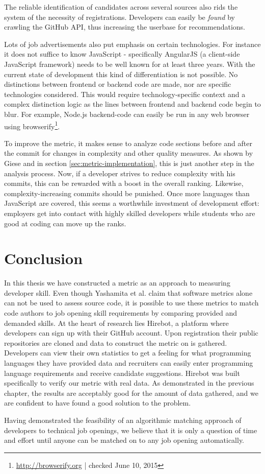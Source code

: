 The reliable identification of candidates across several sources also rids the system of the necessity of registrations. Developers can easily be \textit{found} by crawling the GitHub API, thus increasing the userbase for recommendations.


Lots of job advertisements also put emphasis on certain technologies. For instance it does not suffice to know JavaScript - specifically AngularJS (a client-side JavaScript framework) needs to be well known for at least three years. With the current state of development this kind of differentiation is not possible. No distinctions between frontend or backend code are made, nor are specific technologies considered. This would require technology-specific context and a complex distinction logic as the lines between frontend and backend code begin to blur. For example, Node.js backend-code can easily be run in any web browser using browserify\footnote{\url{http://browserify.org} | checked June 10, 2015}.
\newline

To improve the metric, it makes sense to analyze code sections before and after the commit for changes in complexity and other quality measures. As shown by Giese \cite{pg:2014} and in section \ref{sec:metric-implementation}, this is just another step in the analysis process. Now, if a developer strives to reduce complexity with his commits, this can be rewarded with a boost in the overall ranking. Likewise, complexity-increasing commits should be punished. Once more languages than JavaScript are covered, this seems a worthwhile investment of development effort: employers get into contact with highly skilled developers while students who are good at coding can move up the ranks.

\section{Conclusion}
In this thesis we have constructed a metric as an approach to measuring developer skill. Even though Yashamita et al. claim that software metrics alone can not be used to assess source code\cite{mlya:2012}, it is possible to use these metrics to match code authors to job opening skill requirements by comparing provided and demanded skills. At the heart of research lies Hirebot, a platform where developers can sign up with their GitHub account. Upon registration their public repositories are cloned and data to construct the metric on is gathered. Developers can view their own statistics to get a feeling for what programming languages they have provided data and recruiters can easily enter programming language requirements and receive candidate suggestions. Hirebot was built specifically to verify our metric with real data. As demonstrated in the previous chapter, the results are acceptably good for the amount of data gathered, and we are confident to have found a good solution to the problem.

Having demonstrated the feasibility of an algorithmic matching approach of developers to technical job openings, we believe that it is only a question of time and effort until anyone can be matched on to any job opening automatically.
